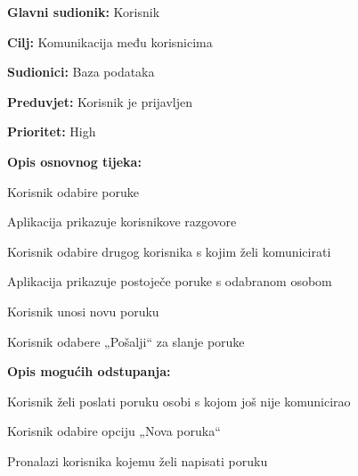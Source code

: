 \noindent {}
	\begin{packed_item}
		
		\item \textbf{Glavni sudionik: }Korisnik
		\item \textbf{Cilj:} Komunikacija među korisnicima
		\item \textbf{Sudionici:} Baza podataka
		\item \textbf{Preduvjet:} Korisnik je prijavljen
		\item \textbf{Prioritet:} High
		\item \textbf{Opis osnovnog tijeka:}
		
		\item[] \begin{packed_enum}
			
			\item Korisnik odabire poruke
			\item Aplikacija prikazuje korisnikove razgovore
			\item Korisnik odabire drugog korisnika s kojim želi komunicirati
			\item Aplikacija prikazuje postoječe poruke s odabranom osobom
			\item Korisnik unosi novu poruku
			\item Korisnik odabere „Pošalji“ za slanje poruke
		\end{packed_enum}
		
		\item \textbf{Opis mogućih odstupanja:}
		
		\item[] \begin{packed_item}
			
			\item[3.a] Korisnik želi poslati poruku osobi s kojom još nije komunicirao
			\item[] \begin{packed_enum}
				\item Korisnik odabire opciju „Nova poruka“
				\item Pronalazi korisnika kojemu želi napisati poruku
			\end{packed_enum}
		\end{packed_item}
	\end{packed_item}
			
